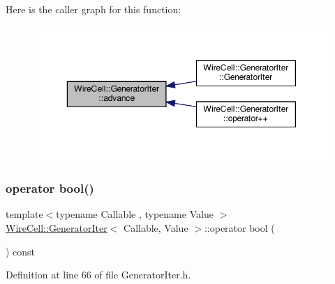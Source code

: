 Here is the caller graph for this function\+:
\nopagebreak
\begin{figure}[H]
\begin{center}
\leavevmode
\includegraphics[width=350pt]{struct_wire_cell_1_1_generator_iter_a3b5e2a57fd913539527a00a2600f32b0_icgraph}
\end{center}
\end{figure}
\mbox{\label{struct_wire_cell_1_1_generator_iter_a1d40f6d528073e96818ea1db9580efa3}} 
\subsubsection{\texorpdfstring{operator bool()}{operator bool()}}
{\footnotesize\ttfamily template$<$typename Callable , typename Value $>$ \\
\hyperlink{struct_wire_cell_1_1_generator_iter}{Wire\+Cell\+::\+Generator\+Iter}$<$ Callable, Value $>$\+::operator bool (\begin{DoxyParamCaption}{ }\end{DoxyParamCaption}) const\hspace{0.3cm}{\ttfamily [inline]}}



Definition at line 66 of file Generator\+Iter.\+h.

\mbox{\label{struct_wire_cell_1_1_generator_iter_a5d54d0b9600540460ee19c5bbc0f0bc7}} 
